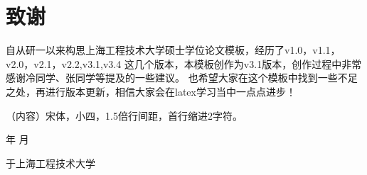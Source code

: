 \chapter*{致谢}
\thispagestyle{plain}

自从研一以来构思上海工程技术大学硕士学位论文模板，经历了v1.0，v1.1，v2.0，v2.1，v2.2,v3.1,v3.4 这几个版本，本模板创作为v3.1版本，创作过程中非常感谢冷同学、张同学等提及的一些建议。
也希望大家在这个模板中找到一些不足之处，再进行版本更新，相信大家会在latex学习当中一点点进步！

（内容）宋体，小四，1.5倍行间距，首行缩进2字符。

\begin{flushright}
    \number\year    年 \number\month  月
    
    于上海工程技术大学
\end{flushright}

